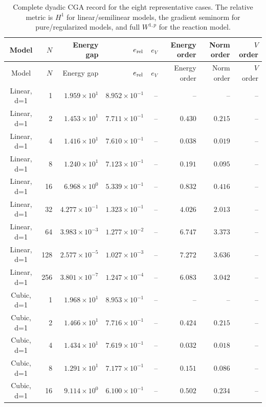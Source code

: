 \begin{longtable}{@{}crrrrrrr@{}}
\caption{Complete dyadic CGA record for the eight representative cases. The relative metric is $H^1$ for linear/semilinear models, the gradient seminorm for pure/regularized models, and full $W^{1,p}$ for the reaction model.}\label{tab:all-dyadic-cga}\\
\toprule
Model & $N$ & Energy gap & $e_{\rm rel}$ & $e_V$ & Energy order & Norm order & $V$ order \\ \midrule
\endfirsthead
\toprule
Model & $N$ & Energy gap & $e_{\rm rel}$ & $e_V$ & Energy order & Norm order & $V$ order \\ \midrule
\endhead
Linear, d=1 & 1 & $1.959\!\times\!10^{1}$ & $8.952\!\times\!10^{-1}$ & -- & -- & -- & -- \\
Linear, d=1 & 2 & $1.453\!\times\!10^{1}$ & $7.711\!\times\!10^{-1}$ & -- & $0.430$ & $0.215$ & -- \\
Linear, d=1 & 4 & $1.416\!\times\!10^{1}$ & $7.610\!\times\!10^{-1}$ & -- & $0.038$ & $0.019$ & -- \\
Linear, d=1 & 8 & $1.240\!\times\!10^{1}$ & $7.123\!\times\!10^{-1}$ & -- & $0.191$ & $0.095$ & -- \\
Linear, d=1 & 16 & $6.968\!\times\!10^{0}$ & $5.339\!\times\!10^{-1}$ & -- & $0.832$ & $0.416$ & -- \\
Linear, d=1 & 32 & $4.277\!\times\!10^{-1}$ & $1.323\!\times\!10^{-1}$ & -- & $4.026$ & $2.013$ & -- \\
Linear, d=1 & 64 & $3.983\!\times\!10^{-3}$ & $1.277\!\times\!10^{-2}$ & -- & $6.747$ & $3.373$ & -- \\
Linear, d=1 & 128 & $2.577\!\times\!10^{-5}$ & $1.027\!\times\!10^{-3}$ & -- & $7.272$ & $3.636$ & -- \\
Linear, d=1 & 256 & $3.801\!\times\!10^{-7}$ & $1.247\!\times\!10^{-4}$ & -- & $6.083$ & $3.042$ & -- \\
Cubic, d=1 & 1 & $1.968\!\times\!10^{1}$ & $8.953\!\times\!10^{-1}$ & -- & -- & -- & -- \\
Cubic, d=1 & 2 & $1.466\!\times\!10^{1}$ & $7.716\!\times\!10^{-1}$ & -- & $0.424$ & $0.215$ & -- \\
Cubic, d=1 & 4 & $1.434\!\times\!10^{1}$ & $7.619\!\times\!10^{-1}$ & -- & $0.032$ & $0.018$ & -- \\
Cubic, d=1 & 8 & $1.291\!\times\!10^{1}$ & $7.177\!\times\!10^{-1}$ & -- & $0.151$ & $0.086$ & -- \\
Cubic, d=1 & 16 & $9.114\!\times\!10^{0}$ & $6.100\!\times\!10^{-1}$ & -- & $0.502$ & $0.234$ & -- \\

\end{longtable}
